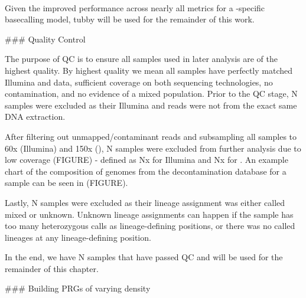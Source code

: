 \begin{markdown}

\\

Given the improved performance across nearly all metrics for a \mtb{}-specific \ont{} basecalling model, tubby will be used for the remainder of this work. 


### Quality Control

The purpose of QC is to ensure all samples used in later analysis are of the highest quality. By highest quality we mean all samples have perfectly matched Illumina and \ont{} data, sufficient coverage on both sequencing technologies, no contamination, and no evidence of a mixed \mtb{} population. Prior to the QC stage, N samples were excluded as their Illumina and \ont{} reads were not from the exact same DNA extraction.  

After filtering out unmapped/contaminant reads and subsampling all samples to 60x (Illumina) and 150x (\ont{}), N samples were excluded from further analysis due to low coverage (FIGURE) - defined as Nx for Illumina and Nx for \ont{}. An example chart of the composition of genomes from the decontamination database for a sample can be seen in (FIGURE).  

Lastly, N samples were excluded as their lineage assignment was either called mixed or unknown. Unknown lineage assignments can happen if the sample has too many heterozygous calls as lineage-defining positions, or there was no called lineages at any lineage-defining position.  

In the end, we have N samples that have passed QC and will be used for the remainder of this chapter.




### Building PRGs of varying density



\end{markdown}

